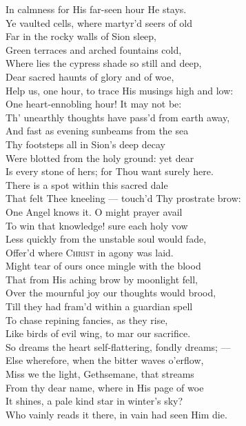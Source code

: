  In calmness for His far-seen hour He stays. \\
  Ye vaulted cells, where martyr’d seers of old \\
 Far in the rocky walls of Sion sleep, \\
 Green terraces and arched fountains cold, \\
 Where lies the cypress shade so still and deep, \\
 Dear sacred haunts of glory and of woe, \\
 Help us, one hour, to trace His musings high and low: \\
  One heart-ennobling hour! It may not be: \\
 Th’ unearthly thoughts have pass’d from earth away, \\
 And fast as evening sunbeams from the sea \\
 Thy footsteps all in Sion’s deep decay \\
 Were blotted from the holy ground: yet dear \\
 Is every stone of hers; for Thou want surely here. \\
  There is a spot within this sacred dale \\
 That felt Thee kneeling — touch’d Thy prostrate brow: \\
 One Angel knows it. O might prayer avail \\
 To win that knowledge! sure each holy vow \\
 Less quickly from the unstable soul would fade, \\
 Offer’d where \textsc{Christ} in agony was laid. \\
  Might tear of ours once mingle with the blood \\
 That from His aching brow by moonlight fell, \\
 Over the mournful joy our thoughts would brood, \\
 Till they had fram’d within a guardian spell \\
 To chase repining fancies, as they rise, \\
 Like birds of evil wing, to mar our sacrifice. \\
  So dreams the heart self-flattering, fondly dreams; — \\
 Else wherefore, when the bitter waves o’erflow, \\
 Miss we the light, Gethsemane, that streams \\
 From thy dear name, where in His page of woe \\
 It shines, a pale kind star in winter’s sky? \\
 Who vainly reads it there, in vain had seen Him die.\\


